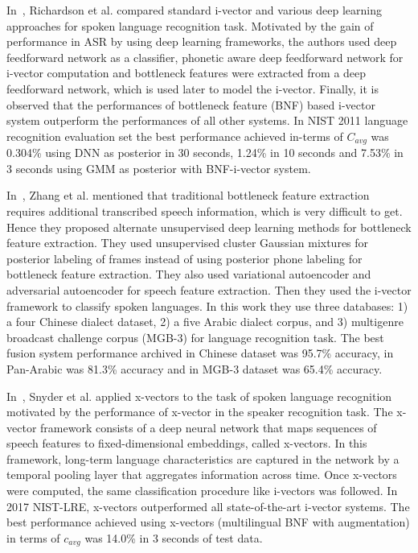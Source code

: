 \begin{spacing}{1.5}
In~\cite{richardson2015deep}, Richardson et al. compared standard i-vector and various deep learning approaches for spoken language recognition task. Motivated by the gain of performance in ASR by using deep learning frameworks, the authors used deep feedforward network as a classifier, phonetic aware deep feedforward network for i-vector computation and bottleneck features were extracted from a deep feedforward network, which is used later to model the i-vector. Finally, it is observed that the performances of bottleneck feature (BNF) based i-vector system outperform the performances of all other systems. In NIST 2011 language recognition evaluation set the best performance achieved in-terms of $C_{avg}$ was 0.304\% using DNN as posterior in 30 seconds, 1.24\% in 10 seconds and 7.53\% in 3 seconds using GMM as posterior with BNF-i-vector system.     


In~\cite{zhang2018language}, Zhang et al. mentioned that traditional bottleneck feature extraction requires additional transcribed speech information, which is very difficult to get. Hence they proposed alternate unsupervised deep learning methods for bottleneck feature extraction. They used unsupervised cluster Gaussian mixtures for posterior labeling of frames instead of using posterior phone labeling for bottleneck feature extraction. They also used variational autoencoder and adversarial autoencoder for speech feature extraction. Then they used the i-vector framework to classify spoken languages. In this work they use three databases: 1) a four Chinese dialect dataset, 2) a five Arabic dialect corpus, and 3) multigenre broadcast challenge corpus (MGB-3) for language recognition task. The best fusion system performance archived in Chinese dataset was 95.7\% accuracy, in Pan-Arabic was 81.3\% accuracy and in MGB-3 dataset was 65.4\% accuracy.

In~\cite{snyder2018spoken}, Snyder et al. applied x-vectors to the task of spoken language recognition motivated by the performance of x-vector in the speaker recognition task. The x-vector framework consists of a deep neural network that maps sequences of speech features to fixed-dimensional embeddings, called x-vectors. In this framework, long-term language characteristics are captured in the network by a temporal pooling layer that aggregates information across time. Once x-vectors were computed, the same classification procedure like i-vectors was followed. In 2017 NIST-LRE, x-vectors outperformed all state-of-the-art i-vector systems. The best performance achieved using x-vectors (multilingual BNF with augmentation) in terms of $c_{avg}$ was 14.0\% in 3 seconds of test data.


\end{spacing}
